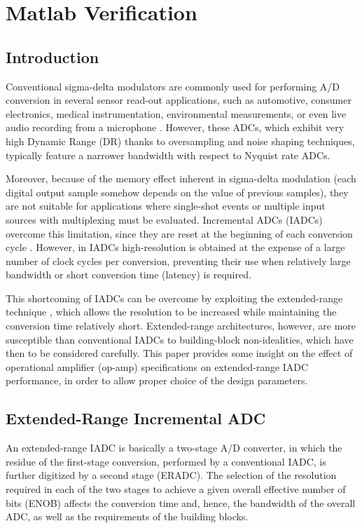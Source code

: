 \chapter{Matlab Verification}


\section{Introduction}

Conventional sigma-delta modulators are commonly used for performing A/D conversion in several sensor read-out applications, such as automotive, consumer electronics, medical instrumentation, environmental measurements, or even live audio recording from a microphone \cite{ESSCIRC_GUINEA}. However, these ADCs, which exhibit very high Dynamic Range (DR) thanks to oversampling and noise shaping techniques, typically feature a narrower bandwidth with respect to Nyquist rate ADCs.

Moreover, because of the memory effect inherent in sigma-delta modulation (each digital output sample somehow depends on the value of previous samples), they are not suitable for applications where single-shot events or multiple input sources with multiplexing must be evaluated.
Incremental ADCs (IADCs) overcome this limitation, since they are reset at the beginning of each conversion cycle \cite{PRIME_CAVALLO}. However, in IADCs high-resolution is obtained at the expense of a large number of clock cycles per conversion, preventing their use when relatively large bandwidth or short conversion time (latency) is required.

This shortcoming of IADCs can be overcome by exploiting the extended-range technique \cite{JSSC_CHEN}\cite{ISSCC_KIM}\cite{PRIME_MOATAZ}\cite{ICICDT_CAVALLO}\cite{ISVC_AGAH}, which allows the resolution to be increased while maintaining the conversion time relatively short. Extended-range architectures, however, are more susceptible than conventional IADCs to building-block non-idealities, which have then to be considered carefully. This paper provides some insight on the effect of operational amplifier (op-amp) specifications on extended-range IADC performance, in order to allow proper choice of the design parameters. 

\section{Extended-Range Incremental ADC}

An extended-range IADC is basically a two-stage A/D converter, in which the residue of the first-stage conversion, performed by a conventional IADC, is further digitized by a second stage (ERADC). The selection of the resolution required in each of the two stages to achieve a given overall effective number of bits (ENOB) affects the conversion time and, hence, the bandwidth of the overall ADC, as well as the requirements of the building blocks.

